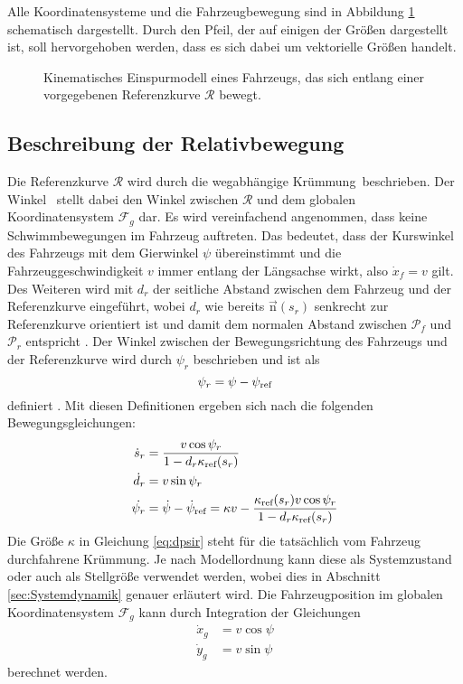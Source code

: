 Alle Koordinatensysteme und die Fahrzeugbewegung sind in Abbildung \ref{fig:Fahrzeugmodell} schematisch dargestellt. Durch den Pfeil, der auf einigen der Größen dargestellt ist, soll hervorgehoben werden, dass es sich dabei um vektorielle Größen handelt. 
\begin{figure}[h]
	\centering
	\fontsize{24pt}{16pt}\selectfont
	\caption{Kinematisches Einspurmodell eines Fahrzeugs, das sich entlang einer vorgegebenen Referenzkurve $\mathcal{R}$ bewegt. }
	\label{fig:Fahrzeugmodell}
\end{figure}

\subsection{Beschreibung der Relativbewegung}\label{subsec:Relativbewegung}
Die Referenzkurve $\mathcal{R}$ wird durch die wegabhängige Krümmung \kapparefofs\,beschrieben. Der Winkel \psiref\, stellt dabei den Winkel zwischen $\mathcal{R}$ und dem globalen Koordinatensystem $\mathcal{F}_g$ dar. Es wird vereinfachend angenommen, dass keine Schwimmbewegungen im Fahrzeug auftreten. Das bedeutet, dass der Kurswinkel des Fahrzeugs mit dem Gierwinkel $\psi$ übereinstimmt und die Fahrzeuggeschwindigkeit $v$ immer entlang der Längsachse wirkt, also $\dot{x}_f = v$ gilt. Des Weiteren wird mit $d_r$ der seitliche Abstand zwischen dem Fahrzeug und der Referenzkurve eingeführt, wobei $d_r$ wie bereits $\vec{\textrm{n}}(s_r)$ senkrecht zur Referenzkurve orientiert ist und damit dem normalen Abstand zwischen $\mathcal{P}_f$ und $\mathcal{P}_r$ entspricht \cite{Rathgeber.2016}. Der Winkel zwischen der Bewegungsrichtung des Fahrzeugs und der Referenzkurve wird durch $\psi_r$ beschrieben und ist als \begin{equation}
	\psi_r = \psi - \psi_{\textrm{ref}}
\end{equation}
definiert \cite{Rathgeber.2016}. Mit diesen Definitionen ergeben sich nach \cite{Rathgeber.2016} die folgenden Bewegungsgleichungen:
\begin{align}
	\dot{s}_r &= \frac{v\cos{\psi_r}}{1-d_r\kappa_{\textrm{ref}}(s_r)} \label{eq:dsr} \\
	\dot{d}_r &= v\sin{\psi_r} \label{eq:ddr} \\
	\dot{\psi_r} &= \dot{\psi} -\dot{\psi}_\textrm{ref} = \kappa v - \frac{\kappa_{\textrm{ref}}(s_r) v\cos{\psi_r}}{1-d_r\kappa_{\textrm{ref}}(s_r)} \label{eq:dpsir}
\end{align}
Die Größe $\kappa$ in Gleichung \eqref{eq:dpsir} steht für die tatsächlich vom Fahrzeug durchfahrene Krümmung. Je nach Modellordnung kann diese als Systemzustand oder auch als Stellgröße verwendet werden, wobei dies in Abschnitt \ref{sec:Systemdynamik} genauer erläutert wird. Die Fahrzeugposition im globalen Koordinatensystem $\mathcal{F}_g$ kann durch Integration der Gleichungen
\begin{align}
\dot{x}_g &= v\cos{\psi} \\
\dot{y}_g &= v\sin{\psi}
\end{align}
berechnet werden.

